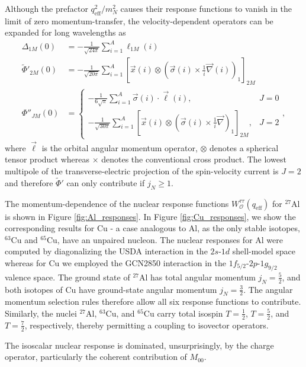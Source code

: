 \documentclass{book}[letterpaper,12pt]
\begin{document}
Although the prefactor $q_\mathrm{eff}^2/m_N^2$ causes their response functions to vanish in the limit of zero momentum-transfer, the velocity-dependent operators can be expanded for long wavelengths as
\begin{equation}
\begin{split}
\Delta_{1M}(0)&=-\frac{1}{\sqrt{24\pi}}\sum_{i=1}^A\ell_{1M}(i)\\
\tilde{\Phi}'_{2M}(0)&=-\frac{1}{\sqrt{20\pi}}\sum_{i=1}^A\left[\vec{x}(i)\otimes\left(\vec{\sigma}(i)\times\frac{1}{i}\vec{\nabla}(i)\right)_1\right]_{2M}\\
\Phi''_{JM}(0)&=\left\{\begin{array}{cc}
-\frac{1}{6\sqrt{\pi}}\sum_{i=1}^A\vec{\sigma}(i)\cdot\vec{\ell}(i), & J=0\\
-\frac{1}{\sqrt{30\pi}}\sum_{i=1}^A\left[\vec{x}(i)\otimes\left(\vec{\sigma}(i)\times\frac{1}{i}\vec{\nabla}\right)_1\right]_{2M}, & J=2
\end{array}\right.,
\end{split}
\end{equation}
where $\vec{\ell}$ is the orbital angular momentum operator, $\otimes$ denotes a spherical tensor product whereas $\times$ denotes the conventional cross product. The lowest multipole of the transverse-electric projection of the spin-velocity current is $J=2$ and therefore $\tilde{\Phi}'$ can only contribute if $j_N\geq 1$.

The momentum-dependence of the nuclear response functions $W^{\tau\tau}_\mathcal{O}(q_\mathrm{eff})$ for $^{27}$Al is shown in Figure \ref{fig:Al_responses}. In Figure \ref{fig:Cu_responses}, we show the corresponding results for Cu - a case analogous to Al, as the only stable isotopes, $^{63}$Cu and $^{65}$Cu, have an unpaired nucleon. The nuclear responses for Al were computed by diagonalizing the USDA interaction in the $2s$-$1d$ shell-model space whereas for Cu we employed the GCN2850 interaction in the $1f_{5/2}$-$2p$-$1g_{9/2}$ valence space. The ground state of $^{27}$Al has total angular momentum $j_N=\frac{5}{2}$, and both isotopes of Cu have ground-state angular momentum $j_N=\frac{3}{2}$. The angular momentum selection rules therefore allow all six response functions to contribute. Similarly, the nuclei $^{27}$Al, $^{63}$Cu, and $^{65}$Cu carry total isospin $T=\frac{1}{2}$, $T=\frac{5}{2}$, and $T=\frac{7}{2}$, respectively, thereby permitting a coupling to isovector operators.

The isoscalar nuclear response is dominated, unsurprisingly, by the charge operator, particularly the coherent contribution of $M_{00}$. 
\end{document}

